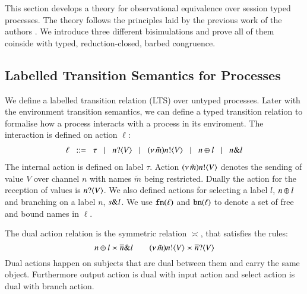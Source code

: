 \noi This section develops a theory for observational equivalence over
session typed \HOp processes. The theory follows the principles
laid by the previous work of the authors
\cite{DBLP:conf/forte/KouzapasYH11,KY13,dkphdthesis}.
We introduce three different bisimulations and prove 
all of them coinside with typed, reduction-closed,
barbed congruence. 

\subsection{Labelled Transition Semantics for Processes}\label{ss:lts}
\noi We define a labelled transition relation (LTS) over
untyped processes. 
Later with the environment transition semantics, 
we can define a typed transition relation to formalise 
how a process interacts with a process in its enviroment. The interaction
is defined on action $\ell$:
\[
\begin{array}{l}
		\ell	\;\;::=\;\;   \tau 
		\;\;\;|\;\;\;n ? \langle V \rangle 
			\;\;\;|\;\;\; (\nu\, \tilde{m}) n ! \langle V \rangle
			\;\;\;|\;\;\;  n \oplus l 
			\;\;\;|\;\;\; n \& l 
\end{array}
\]
\noi The internal action is defined on label $\tau$.
Action $(\nu\, \tilde{m}) n ! \langle V \rangle$ denotes the sending of value $V$ over channel $n$ with
names $\tilde{m}$ being restricted.
Dually the action for the reception of values is 
$n ? \langle V \rangle$.
We also defined actions for selecting a label $l$, 
$n \oplus l$ and branching on a label
$n$, $s \& l$.
We use $\mathtt{fn}(\ell)$ and $\mathtt{bn}(\ell)$ to denote 
a set of free and bound names in $\ell$. 

The dual action relation is the symmetric relation $\asymp$, that satisfies the rules:
\[
	n \oplus l \asymp \overline{n} \& l
	\qquad
	(\nu\, \tilde{m}) n ! \langle V \rangle \asymp \overline{n} ? \langle V \rangle
\]
Dual actions happen on subjects that are dual between them and carry the same
object. Furthermore output action is dual with input action and 
select action is dual with branch action.

\smallskip

